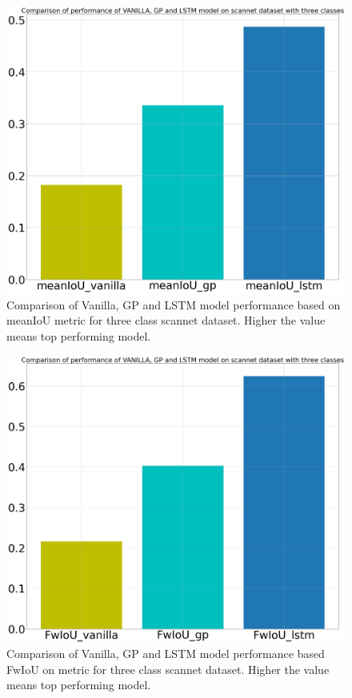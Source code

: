 	\begin{figure}
		\centering
		\includegraphics[width=12cm]{images/three_classes_meanIoU.png}
		\caption{Comparison of Vanilla, GP and LSTM model performance based on  meanIoU metric for three class scannet dataset. Higher the value means top performing model.}
		\label{fig:performance_metric_three_classes_unet}
	\end{figure}

	\begin{figure}
		\centering
		\includegraphics[width=12cm]{images/three_classes_FwIoU.png}
		\caption{Comparison of Vanilla, GP and LSTM model performance based  FwIoU on metric for three class scannet dataset. Higher the value means top performing model.}
		\label{fig:performance_metric_three_classes_unet}
	\end{figure}

